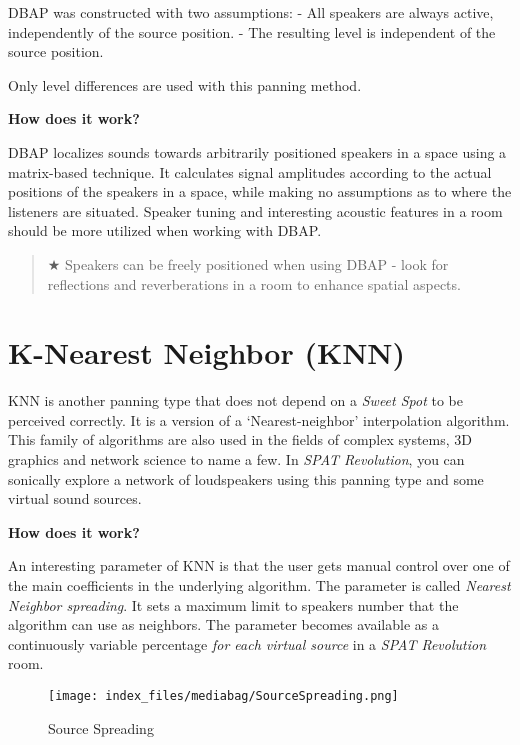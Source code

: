 \documentclass[
  letterpaper,
  DIV=11,
  numbers=noendperiod]{scrreport}
\begin{document}
DBAP was constructed with two assumptions: - All speakers are always
active, independently of the source position. - The resulting level is
independent of the source position.

Only level differences are used with this panning method.

\textbf{How does it work?}

DBAP localizes sounds towards arbitrarily positioned speakers in a space
using a matrix-based technique. It calculates signal amplitudes
according to the actual positions of the speakers in a space, while
making no assumptions as to where the listeners are situated. Speaker
tuning and interesting acoustic features in a room should be more
utilized when working with DBAP.

\begin{quote}
★ Speakers can be freely positioned when using DBAP - look for
reflections and reverberations in a room to enhance spatial aspects.
\end{quote}

\hypertarget{panType-KNN}{%
\section{K-Nearest Neighbor (KNN)}\label{panType-KNN}}

KNN is another panning type that does not depend on a \emph{Sweet Spot}
to be perceived correctly. It is a version of a `Nearest-neighbor'
interpolation algorithm. This family of algorithms are also used in the
fields of complex systems, 3D graphics and network science to name a
few. In \emph{SPAT Revolution}, you can sonically explore a network of
loudspeakers using this panning type and some virtual sound sources.

\textbf{How does it work?}

An interesting parameter of KNN is that the user gets manual control
over one of the main coefficients in the underlying algorithm. The
parameter is called \emph{Nearest Neighbor spreading}. It sets a maximum
limit to speakers number that the algorithm can use as neighbors. The
parameter becomes available as a continuously variable percentage
\emph{for each virtual source} in a \emph{SPAT Revolution} room.

\begin{figure}

{\centering \texttt{[image: index\_files/mediabag/SourceSpreading.png]}

}

\caption{Source Spreading}

\end{figure}
\end{document}
